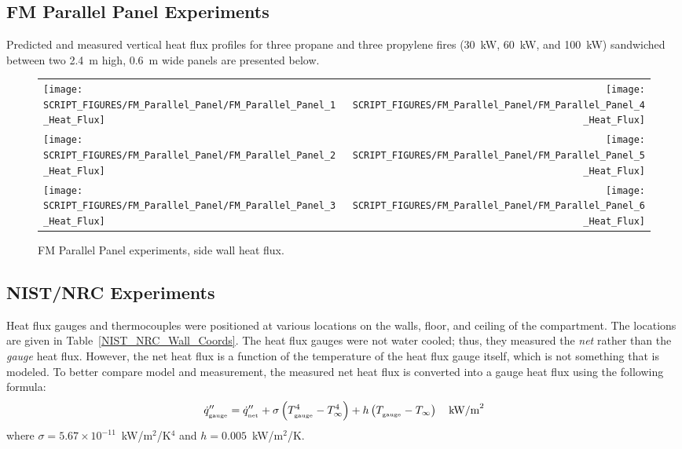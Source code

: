 \clearpage


\subsection{FM Parallel Panel Experiments}

Predicted and measured vertical heat flux profiles for three propane and three propylene fires (30~kW, 60~kW, and 100~kW) sandwiched between two 2.4~m high, 0.6~m wide panels are presented below.

\begin{figure}[h!]
\begin{tabular*}{\textwidth}{l@{\extracolsep{\fill}}r}
\texttt{[image: SCRIPT\_FIGURES/FM\_Parallel\_Panel/FM\_Parallel\_Panel\_1\_Heat\_Flux]} &
\texttt{[image: SCRIPT\_FIGURES/FM\_Parallel\_Panel/FM\_Parallel\_Panel\_4\_Heat\_Flux]} \\
\texttt{[image: SCRIPT\_FIGURES/FM\_Parallel\_Panel/FM\_Parallel\_Panel\_2\_Heat\_Flux]} &
\texttt{[image: SCRIPT\_FIGURES/FM\_Parallel\_Panel/FM\_Parallel\_Panel\_5\_Heat\_Flux]} \\
\texttt{[image: SCRIPT\_FIGURES/FM\_Parallel\_Panel/FM\_Parallel\_Panel\_3\_Heat\_Flux]} &
\texttt{[image: SCRIPT\_FIGURES/FM\_Parallel\_Panel/FM\_Parallel\_Panel\_6\_Heat\_Flux]}
\end{tabular*}
\label{FM_Parallel_Panel}
\caption[FM Parallel Panel experiments, side wall heat flux]
{FM Parallel Panel experiments, side wall heat flux.}
\end{figure}


\clearpage

\subsection{NIST/NRC Experiments}

Heat flux gauges and thermocouples were positioned at various locations on the walls, floor, and ceiling of the compartment. The locations are given in Table~\ref{NIST_NRC_Wall_Coords}. The heat flux gauges were not water cooled; thus, they measured the {\em net} rather than the {\em gauge} heat flux. However, the net heat flux is a function of the temperature of the heat flux gauge itself, which is not something that is modeled. To better compare model and measurement, the measured net heat flux is converted into a gauge heat flux using the following formula:
\begin{equation}
\dot{q}''_{_{\textrm{\tiny gauge}}} = \dot{q}''_{_{\textrm{\tiny net}}} + \sigma \left( T^4_{_{\textrm{\tiny gauge}}} - T^4_\infty \right) + h  \left( T_{_{\textrm{\tiny gauge}}}-T_\infty \right) \quad \hbox{kW/m}^2
\end{equation}
where $\sigma=5.67 \times 10^{-11}$~kW/m$^2$/K$^4$ and $h=0.005$~kW/m$^2$/K.

